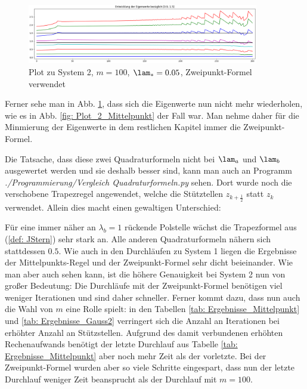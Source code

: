 \documentclass[a4paper,12pt]{report}
\newcommand{\1}{\mathds{1}}
\theoremstyle{plain} %
\theoremstyle{definition} %
\theoremstyle{remark}
\begin{document}
            \begin{figure}[ht]
                  \centering
                  \includegraphics[width=0.9\textwidth, keepaspectratio]{./Verbesserung_Mittelpunkt/Plot_2_100_0.05.png}
                  \caption{Plot zu System 2, $m=100$, $\lam_*=0.05$, Zweipunkt-Formel verwendet}
                  \label{fig: Plot_2_150_0.05_Gauss2}
            \end{figure}

            Ferner sehe man in Abb. \ref{fig: Plot_2_150_0.05_Gauss2}, dass sich die Eigenwerte nun nicht mehr wiederholen, wie es in Abb. \ref{fig: Plot_2_Mittelpunkt} der Fall war.
            Man nehme daher für die Minmierung der Eigenwerte in dem restlichen Kapitel immer die Zweipunkt-Formel.

            Die Tatsache, dass diese zwei Quadraturformeln nicht bei $\lam_a$ und $\lam_b$ ausgewertet werden und sie deshalb besser sind, kann man auch an Programm
            \textit{./Programmierung/Vergleich Quadraturformeln.py} sehen. Dort wurde noch die verschobene Trapezregel angewendet, welche die Stütztellen $z_{k+\frac 1 2}$ statt $z_k$ verwendet.
            Allein dies macht einen gewaltigen Unterschied:

            Für eine immer näher an $\lambda_b = 1$ rückende Polstelle wächst die Trapezformel aus (\ref{def: JStern}) sehr stark an. Alle anderen Quadraturformeln nähern sich stattdessen $0.5$.
            Wie auch in den Durchläufen zu System 1 liegen die Ergebnisse der Mittelpunkts-Regel und der Zweipunkt-Formel sehr dicht beieinander.
            Wie man aber auch sehen kann, ist die höhere Genauigkeit bei System 2 nun von großer Bedeutung:
            Die Durchläufe mit der Zweipunkt-Formel benötigen viel weniger Iterationen und sind daher schneller.
            Ferner kommt dazu, dass nun auch die Wahl von $m$ eine Rolle spielt: in den Tabellen \ref{tab: Ergebnisse_Mittelpunkt} und \ref{tab: Ergebnisse_Gauss2} verringert sich die Anzahl an Iterationen bei erhöhter Anzahl an Stützstellen.
            Aufgrund des damit verbundenen erhöhten Rechenaufwands benötigt der letzte Durchlauf aus Tabelle \ref{tab: Ergebnisse_Mittelpunkt} aber noch mehr Zeit als der vorletzte.
            Bei der Zweipunkt-Formel wurden aber so viele Schritte eingespart, dass nun der letzte Durchlauf weniger Zeit beansprucht als der Durchlauf mit $m=100$.
\end{document}
